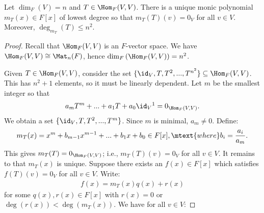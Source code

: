     \begin{theorem}
        Let $\dim_F{(V)} = n$ and $T \in \Hom_F{(V,V)}$. There is a unique monic polynomial $m_T(x) \in F[x]$ of lowest degree so that $m_T(T)(v) = 0_V$ for all $v \in V$. Moreover, $\deg_{m_T}{(T)}\leq n^2$.
    \end{theorem}
        \begin{proof}
            Recall that $\Hom_F{(V,V)}$ is an $F$-vector space. We have $\Hom_F{(V,V)} \cong \Mat_n{(F)}$, hence $\dim_F{(\Hom_F{(V,V)})} = n^2$.

            Given $T \in \Hom_F{(V,V)}$, consider the set $\{\id_V,T,T^2,...,T^{n^2}\} \subseteq \Hom_F{(V,V)}$. This has $n^2 + 1$ elements, so it must be linearly dependent. Let $m$ be the smallest integer so that
                \begin{equation*}
                \begin{split}
                    a_mT^m + ... + a_1T + a_0 \id_V\footnotemark = 0_{\Hom_F{(V,V)}}.
                \end{split}
                \end{equation*}
            We obtain a set $\{\id_V,T,T^2,...,T^m\}$. Since $m$ is minimal, $a_m \neq 0$. Define:
                \begin{equation*}
                \begin{split}
                    m_T(x) = x^m + b_{m-1}x^{m-1} + ... + b_1x + b_0 \in F[x], \mtext{where} b_i = \frac{a_i}{a_m}.
                \end{split}
                \end{equation*}
            This gives $m_T(T) = 0_{\Hom_F{(V,V)}}$; i.e., $m_T(T)(v) = 0_V$ for all $v \in V$. 
                It remains to that $m_T(x)$ is unique. Suppose there exists an $f(x) \in F[x]$ which satisfies $f(T)(v) = 0_V$ for all $v \in V$. Write:
                    \begin{equation*}
                    \begin{split}
                        f(x) = m_T(x)q(x) + r(x)
                    \end{split}
                    \end{equation*}
                for some $q(x), r(x) \in F[x]$ with $r(x) = 0$ or $\deg{(r(x))} < \deg{(m_T(x))}$. We have for all $v \in V$:

\end{proof}

